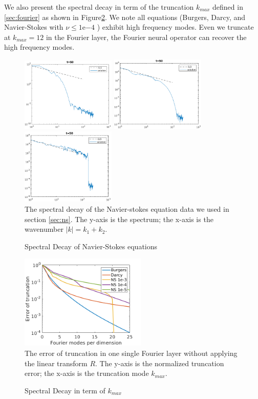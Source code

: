 \documentclass{article} %
\begin{document}
We also present the spectral decay in term of the truncation $k_{max}$ defined in \ref{sec:fourier} as shown in Figure\ref{fig:spectral2}. We note all equations (Burgers, Darcy, and Navier-Stokes with $\nu \leq 1\mathrm{e}{-4}$ ) exhibit high frequency modes. Even we truncate at $k_{max} = 12$ in the Fourier layer, the Fourier neural operator can recover the high frequency modes.
\begin{figure}[h]
    \centering
    \includegraphics[width=4.5cm]{figs/ns_t50_n3_spectra.png}
    \includegraphics[width=4.5cm]{figs/ns_t50_n4_spectra.png}
    \includegraphics[width=4.5cm]{figs/ns_t50_n5_spectra.png}\\
    {\small The spectral decay of the Navier-stokes equation data we used in section \ref{sec:ns}. The y-axis is the spectrum; the x-axis is the wavenumber $|k| = k_1 + k_2$.  }
    \caption{Spectral Decay of Navier-Stokes equations}
    \label{fig:spectral1}
\end{figure}

\begin{figure}[h]
    \centering
    \includegraphics[width=6cm]{figs/spectral.png}\\
    {\small The error of truncation in one single Fourier layer without applying the linear transform $R$. The y-axis is the normalized truncation error; the x-axis is the truncation mode $k_{max}$.  }
    \caption{Spectral Decay in term of $k_{max}$ }
    \label{fig:spectral2}
\end{figure}
\end{document}
